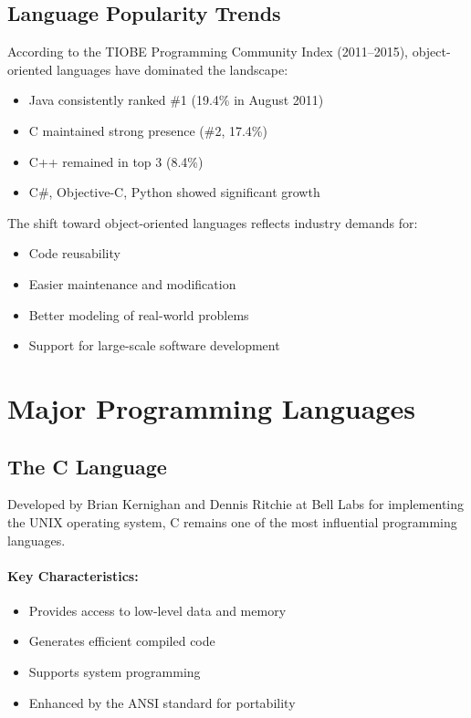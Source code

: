 \documentclass[11pt, a4paper, notitlepage]{report}
\theoremstyle{definition}
\theoremstyle{remark}
\theoremstyle{definition}
\begin{document}
\subsection{Language Popularity Trends}

According to the TIOBE Programming Community Index (2011--2015), object-oriented languages have dominated the landscape:
\begin{itemize}
  \item Java consistently ranked \#1 (19.4\% in August 2011)
  \item C maintained strong presence (\#2, 17.4\%)
  \item C++ remained in top 3 (8.4\%)
  \item C\#, Objective-C, Python showed significant growth
\end{itemize}

The shift toward object-oriented languages reflects industry demands for:
\begin{itemize}
  \item Code reusability
  \item Easier maintenance and modification
  \item Better modeling of real-world problems
  \item Support for large-scale software development
\end{itemize}

\section{Major Programming Languages}
\label{sec:ch1-languages}

\subsection{The C Language}

Developed by Brian Kernighan and Dennis Ritchie at Bell Labs for implementing the UNIX operating system, C remains one of the most influential programming languages.

\paragraph{Key Characteristics:}
\begin{itemize}
  \item Provides access to low-level data and memory
  \item Generates efficient compiled code
  \item Supports system programming
  \item Enhanced by the ANSI standard for portability
\end{itemize}
\end{document}

